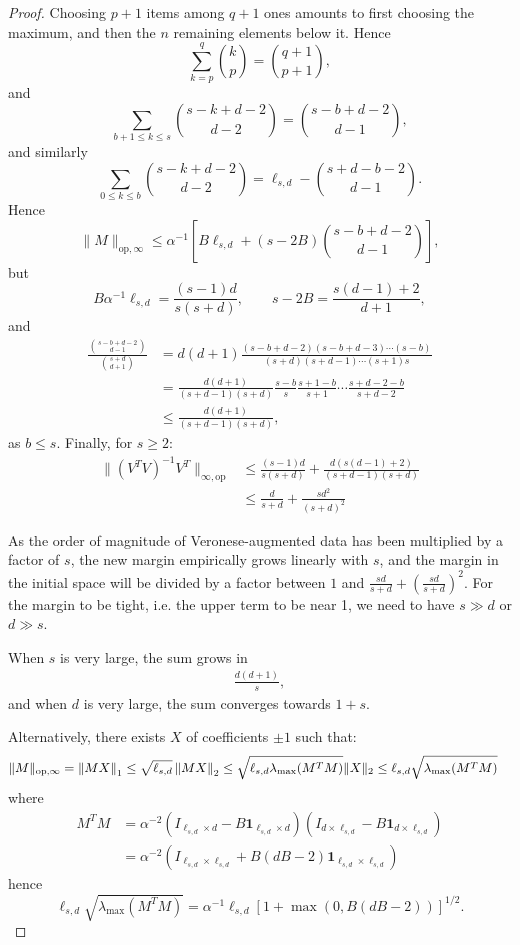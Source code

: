 \documentclass[oneside,english,a4paper]{amsart}
\numberwithin{equation}{section}
\numberwithin{figure}{section}
\theoremstyle{plain}
\theoremstyle{definition}
\theoremstyle{plain}
\theoremstyle{remark}
\theoremstyle{plain}
\theoremstyle{definition}
\theoremstyle{definition}
\begin{document}
\begin{proof}
Choosing $p+1$ items among $q+1$ ones amounts to first choosing
the maximum, and then the $n$ remaining elements below it. Hence
\[
\sum_{k=p}^{q}\binom{k}{p}=\binom{q+1}{p+1},
\]
and 
\[
\sum_{b+1\le k\le s}\binom{s-k+d-2}{d-2}=\binom{s-b+d-2}{d-1},
\]
and similarly
\[
\sum_{0\le k\le b}\binom{s-k+d-2}{d-2}=\ell_{s,d}-\binom{s+d-b-2}{d-1}.
\]
Hence
\[
\lVert M\rVert_{\text{op},\infty}\le\alpha^{-1}\left[B\ell_{s,d}+(s-2B)\binom{s-b+d-2}{d-1}\right],
\]
but
\[
B\alpha^{-1}\ell_{s,d}=\frac{(s-1)d}{s(s+d)},\qquad s-2B=\frac{s(d-1)+2}{d+1},
\]
and
\begin{align*}
\frac{\binom{s-b+d-2}{d-1}}{\binom{s+d}{d+1}} & =d(d+1)\frac{(s-b+d-2)(s-b+d-3)\cdots(s-b)}{(s+d)(s+d-1)\cdots(s+1)s}\\
 & =\frac{d(d+1)}{(s+d-1)(s+d)}\frac{s-b}{s}\frac{s+1-b}{s+1}\cdots\frac{s+d-2-b}{s+d-2}\\
 & \le\frac{d(d+1)}{(s+d-1)(s+d)},
\end{align*}
as $b\le s$. Finally, for $s\ge2$:
\begin{align*}
\lVert(V^{T}V)^{-1}V^{T}\rVert_{\infty,\text{op}} & \le\frac{(s-1)d}{s(s+d)}+\frac{d(s(d-1)+2)}{(s+d-1)(s+d)}\\
 & \le\frac{d}{s+d}+\frac{sd^{2}}{(s+d)^{2}}
\end{align*}

As the order of magnitude of Veronese-augmented data has been multiplied
by a factor of $s$, the new margin empirically grows linearly with
$s$, and the margin in the initial space will be divided by a factor
between $1$ and $\frac{sd}{s+d}+\left(\frac{sd}{s+d}\right)^{2}$.
For the margin to be tight, i.e. the upper term to be near 1, we need
to have $s\gg d$ or $d\gg s$.

When $s$ is very large, the sum grows in
\begin{align*}
\frac{d(d+1)}{s},
\end{align*}
and when $d$ is very large, the sum converges towards $1+s$.

Alternatively, there exists $X$ of coefficients $\pm1$ such that:
\begin{align*}
\lVert M\rVert_{\text{op,\ensuremath{\infty}}} & =\left\lVert MX\right\rVert_{1}\le\sqrt{\ell_{s,d}}\left\lVert MX\right\rVert _{2}\le\sqrt{\ell_{s,d}\lambda_{\text{max}}(M^{T}M)}\lVert X\rVert_{2}\le\ell_{s,d}\sqrt{\lambda_{\text{max}}(M^{T}M)}
\end{align*}
where 
\begin{align*}
M^{T}M & =\alpha^{-2}\left(I_{\ell_{s,d}\times d}-B\mathbf{1}_{\ell_{s,d}\times d}\right)\left(I_{d\times\ell_{s,d}}-B\mathbf{1}_{d\times\ell_{s,d}}\right)\\
 & =\alpha^{-2}\left(I_{\ell_{s,d}\times\ell_{s,d}}+B\left(dB-2\right)\mathbf{1}_{\ell_{s,d}\times\ell_{s,d}}\right)
\end{align*}
hence
\[
\ell_{s,d}\sqrt{\lambda_{\text{max}}(M^{T}M)}=\alpha^{-1}\ell_{s,d}\left[1+\max\left(0,B(dB-2)\right)\right]^{1/2}.
\]


\end{proof}
\end{document}
